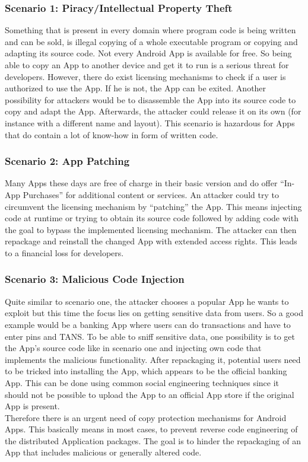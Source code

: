 \subsubsection*{Scenario 1: Piracy/Intellectual Property Theft}\label{section:scenario_1}
Something that is present in every domain where program code is being written
and can be sold, is illegal copying of a whole executable program or copying and adapting its source code.
Not every Android App is available for free. So being
able to copy an App to another device and get it to run is a serious threat for developers. However, there do exist licensing mechanisms to check if a user is authorized to use the App. If he is not, the App can be exited.
Another possibility for attackers would be to disassemble
the App into its source code to copy and adapt the App. Afterwards, the attacker could release it on its own (for instance with a different name and layout).
This scenario is hazardous for Apps that do contain a lot of know-how in form of written code.


\subsubsection*{Scenario 2: App Patching}\label{section:scenario_2}
Many Apps these days are free of charge in their basic version and
do offer ``In-App Purchases'' for additional content or services.
An attacker could try to circumvent the licensing mechanism by ``patching'' the App. This means injecting code at runtime or trying to obtain its source code followed by adding code with the goal to bypass the implemented licensing
mechanism. The attacker can then repackage and reinstall the changed App
with extended access rights. This leads to a financial loss for developers.

\subsubsection*{Scenario 3: Malicious Code Injection}\label{section:scenario_3}
Quite similar to scenario one, the attacker chooses a popular App he wants to exploit but this time the focus lies on getting sensitive data from users.
So a good example would be a banking App where users can do transactions and have to enter pins and TANS.
To be able to sniff sensitive data, one possibility is to get the App’s source code like in scenario one and injecting own code that implements the malicious functionality. After repackaging it, potential users need to be tricked into installing the App, which appears to be the official banking App. This can be done using common social engineering techniques since it should not be possible to upload the App to an official App store if the original App is present.\\

Therefore there is an urgent need of copy protection mechanisms
for Android Apps. This basically means in most cases, to prevent reverse code engineering of the distributed Application packages. The goal is to hinder the repackaging of an App that includes malicious or generally altered code.
